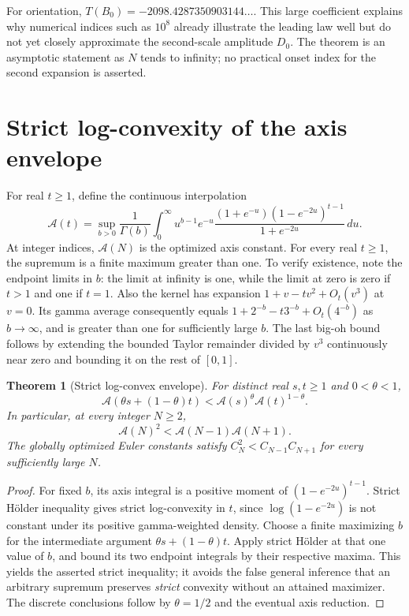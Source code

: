 \documentclass[11pt]{article}
\numberwithin{equation}{section}
\newtheorem{theorem}{Theorem}[section]
\theoremstyle{definition}
\theoremstyle{remark}
\begin{document}
For orientation, $T(B_0)=-2098.4287350903144\ldots$.
This large coefficient explains why numerical indices such as $10^8$
already illustrate the leading law well but do not yet closely
approximate the second-scale amplitude $D_0$.  The theorem is an
asymptotic statement as $N$ tends to infinity; no practical onset
index for the second expansion is asserted.

\section{Strict log-convexity of the axis envelope}
\label{eul:sec:axis-logconvex}
For real $t\geq1$, define the continuous interpolation
\[
 \mathcal A(t)=\sup_{b>0}\frac1{\Gamma(b)}\int_0^\infty
 u^{b-1}e^{-u}
 \frac{(1+e^{-u})(1-e^{-2u})^{t-1}}{1+e^{-2u}}\,du.
\]
At integer indices, $\mathcal A(N)$ is the optimized axis constant.
For every real $t\geq1$, the supremum is a finite maximum greater
than one.  To verify existence, note the endpoint limits in $b$:
the limit at infinity is one, while the limit at zero is zero if
$t>1$ and one if $t=1$.  Also the kernel has expansion
$1+v-tv^2+O_t(v^3)$ at $v=0$.  Its gamma average consequently equals
$1+2^{-b}-t3^{-b}+O_t(4^{-b})$ as $b\to\infty$, and is greater
than one for sufficiently large $b$.
The last big-oh bound follows by extending the bounded Taylor
remainder divided by $v^3$ continuously near zero and bounding it
on the rest of $[0,1]$.

\begin{theorem}[Strict log-convex envelope]
\label{eul:thm:axis-logconvex}
For distinct real $s,t\geq1$ and $0<\theta<1$,
\[
 \mathcal A(\theta s+(1-\theta)t)
     <\mathcal A(s)^\theta\mathcal A(t)^{1-\theta}.
\]
In particular, at every integer $N\geq2$,
\[
 \mathcal A(N)^2<\mathcal A(N-1)\mathcal A(N+1).
\]
The globally optimized Euler constants satisfy
$C_N^2<C_{N-1}C_{N+1}$ for every sufficiently large $N$.
\end{theorem}
\begin{proof}
For fixed $b$, its axis integral is a positive moment of
$(1-e^{-2u})^{t-1}$.  Strict H\"older inequality gives strict
log-convexity in $t$, since $\log(1-e^{-2u})$ is not constant
under its positive gamma-weighted density.
Choose a finite maximizing $b$ for the intermediate argument
$\theta s+(1-\theta)t$.  Apply strict H\"older at that one value
of $b$, and bound its two endpoint integrals by their respective
maxima.  This yields the asserted strict inequality; it avoids
the false general inference that an arbitrary supremum preserves
\emph{strict} convexity without an attained maximizer.
The discrete conclusions follow by $\theta=1/2$ and the eventual
axis reduction.
\end{proof}
\end{document}
